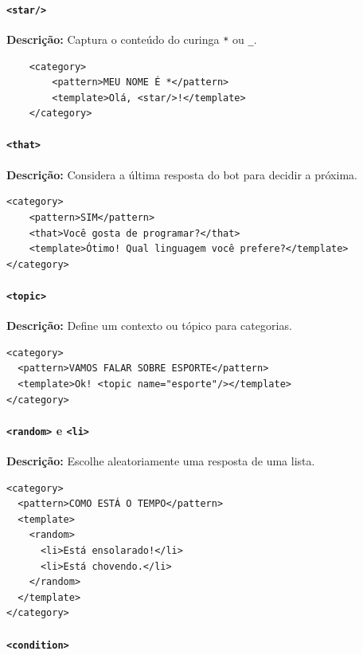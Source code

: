 \documentclass[14pt,a4paper,oneside]{book}
\begin{document}
\paragraph{\texttt{<star/>}} 

\textbf{Descrição:} Captura o conteúdo do curinga \texttt{*} ou \texttt{\_}. 

\begin{verbatim}
	<category>
		<pattern>MEU NOME É *</pattern>
		<template>Olá, <star/>!</template>
	</category>
\end{verbatim}

\paragraph{\texttt{<that>}} 

\textbf{Descrição:} Considera a última resposta do bot para decidir a próxima. 

\begin{verbatim}
<category>
	<pattern>SIM</pattern>
	<that>Você gosta de programar?</that>
	<template>Ótimo! Qual linguagem você prefere?</template>
</category>
\end{verbatim}

\paragraph{\texttt{<topic>}} 

\textbf{Descrição:} Define um contexto ou tópico para categorias. 

\begin{verbatim}
<category>
  <pattern>VAMOS FALAR SOBRE ESPORTE</pattern>
  <template>Ok! <topic name="esporte"/></template>
</category>
\end{verbatim}

\paragraph{\texttt{<random>} e \texttt{<li>}} 

\textbf{Descrição:} Escolhe aleatoriamente uma resposta de uma lista. 

\begin{verbatim}
<category>
  <pattern>COMO ESTÁ O TEMPO</pattern>
  <template>
    <random>
      <li>Está ensolarado!</li>
      <li>Está chovendo.</li>
    </random>
  </template>
</category>
\end{verbatim}

\paragraph{\texttt{<condition>}} 
\end{document}
